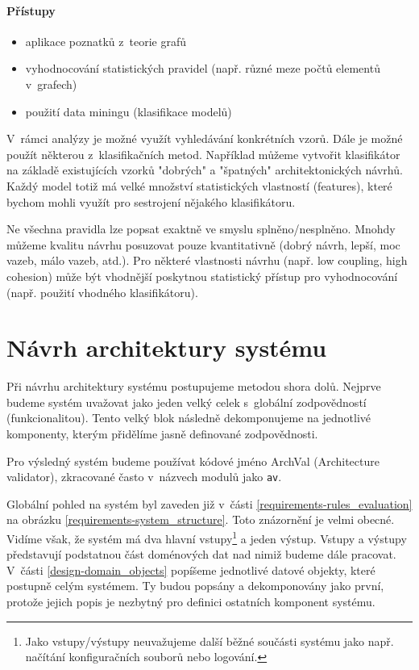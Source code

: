 \paragraph{Přístupy}
\begin{itemize}
\item aplikace poznatků z~teorie grafů
\item vyhodnocování statistických pravidel (např. různé meze počtů elementů v~grafech)
\item použití data miningu (klasifikace modelů)
\end{itemize}

V~rámci analýzy je možné využít vyhledávání konkrétních vzorů. Dále je možné použít některou z~klasifikačních metod. Například můžeme vytvořit klasifikátor na základě existujících vzorků "dobrých" a "špatných" architektonických návrhů. Každý model totiž má velké množství statistických vlastností (features), které bychom mohli využít pro sestrojení nějakého klasifikátoru.

Ne všechna pravidla lze popsat exaktně ve smyslu splněno/nesplněno. Mnohdy můžeme kvalitu návrhu posuzovat pouze kvantitativně (dobrý návrh, lepší, moc vazeb, málo vazeb, atd.). Pro některé vlastnosti návrhu (např. low coupling, high cohesion) může být vhodnější poskytnou statistický přístup pro vyhodnocování (např. použití vhodného klasifikátoru).

\section{Návrh architektury systému}
\label{design-architecture}

Při návrhu architektury systému postupujeme metodou shora dolů. Nejprve budeme systém uvažovat jako jeden velký celek s~globální zodpovědností (funkcionalitou). Tento velký blok následně dekomponujeme na jednotlivé komponenty, kterým přidělíme jasně definované zodpovědnosti.

Pro výsledný systém budeme používat kódové jméno ArchVal (Architecture validator), zkracované často v~názvech modulů jako \verb+av+.

Globální pohled na systém byl zaveden již v~části \ref{requirements-rules_evaluation} na obrázku \ref{requirements-system_structure}. Toto znázornění je velmi obecné. Vidíme však, že systém má dva hlavní vstupy\footnote{Jako vstupy/výstupy neuvažujeme další běžné součásti systému jako např. načítání konfiguračních souborů nebo logování.} a jeden výstup. Vstupy a výstupy představují podstatnou část doménových dat nad nimiž budeme dále pracovat. V~části \ref{design-domain_objects} popíšeme jednotlivé datové objekty, které postupně  celým systémem. Ty budou popsány a dekomponovány jako první, protože jejich popis je nezbytný pro definici ostatních komponent systému.


